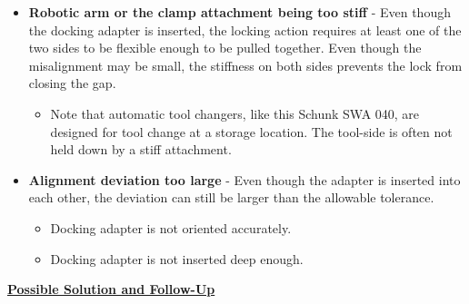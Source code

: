 \documentclass[11pt]{book}
\begin{document}
\begin{itemize}
	\item \textbf{Robotic arm or the clamp attachment being too stiff} - Even though the docking adapter is inserted, the locking action requires at least one of the two sides to be flexible enough to be pulled together. Even though the misalignment may be small, the stiffness on both sides prevents the lock from closing the gap.

\begin{itemize}
	\item Note that automatic tool changers, like this Schunk SWA 040, are designed for tool change at a storage location. The tool-side is often not held down by a stiff attachment.

\end{itemize}
	\item \textbf{Alignment deviation too large }- Even though the adapter is inserted into each other, the deviation can still be larger than the allowable tolerance.

\begin{itemize}
	\item Docking adapter is not oriented accurately.

	\item Docking adapter is not inserted deep enough.

\end{itemize}
\end{itemize}
\textbf{\uline{Possible Solution and Follow-Up}}
\end{document}
